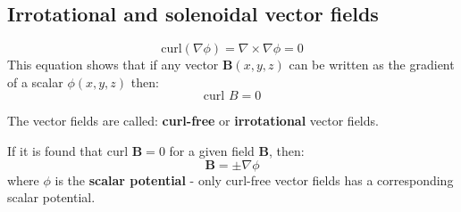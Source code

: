\documentclass[10pt,a4paper]{article}
\begin{document}
\subsection{Irrotational and solenoidal vector fields}

\begin{tcolorbox}[breakable,colback=white]
    $$
    \text{curl}(\nabla\phi) = \nabla \times \nabla\phi = 0
$$
This equation shows that if any vector $\textbf{B}(x,y,z)$ can be written as the gradient of a
scalar $\phi(x,y,z)$ then:
$$
    \text{curl }B = 0
$$

The vector fields are called: \textbf{curl-free} or \textbf{irrotational} vector fields.
\end{tcolorbox}

If it is found that $\text{curl }\textbf{B}=0$ for a given field $\textbf{B}$, then:
$$
    \textbf{B}=\pm\nabla\phi
$$
where $\phi$ is the \textbf{scalar potential} - only curl-free vector fields has a corresponding
scalar potential.
\end{document}
